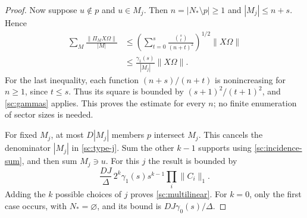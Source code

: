 \begin{proof}
Now suppose $u\notin p$ and $u\in M_j$. Then
$n=|N_*\setminus p|\ge1$ and $|M_j|\le n+s$. Hence
\begin{align}
 \sum_M\frac{\|\Pi_MX\Omega\|}{|M|}
 &\le\left(\sum_{t=0}^{s}\frac{\binom{s}{t}}{(n+t)^2}
          \right)^{1/2}\|X\Omega\|
 \nonumber\\
 &\le\frac{\gamma_1(s)}{|M_j|}\|X\Omega\|.
 \label{sc:type-j}
\end{align}
For the last inequality, each function
$(n+s)/(n+t)$ is nonincreasing for $n\ge1$, since $t\le s$.
Thus its square is bounded by $(s+1)^2/(t+1)^2$, and
\eqref{sc:gammas} applies. This proves the estimate for every $n$;
no finite enumeration of sector sizes is needed.

For fixed $M_j$, at most $D|M_j|$ members $p$ intersect $M_j$.
This cancels the denominator $|M_j|$ in \eqref{sc:type-j}.
Sum the other $k-1$ supports using \eqref{sc:incidence-sum},
and then sum $M_j\ni u$. For this $j$ the result is bounded by
\[
 \frac{DJ}{\Delta}\,2^k\gamma_1(s)s^{k-1}
                         \prod_i\|C_i\|_1.
\]
Adding the $k$ possible choices of $j$ proves
\eqref{sc:multilinear}. For $k=0$, only the first case occurs,
with $N_*=\varnothing$, and its bound is $DJ\gamma_0(s)/\Delta$.
\end{proof}

